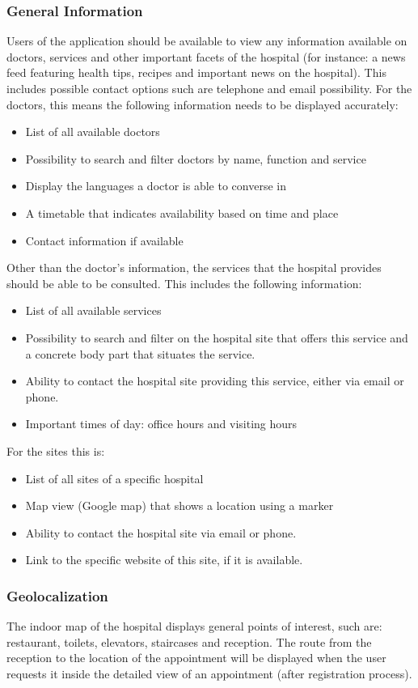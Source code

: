 \subsubsection{General Information}
Users of the application should be available to view any information available on doctors, services and other important facets of the hospital (for instance: a news feed featuring health tips, recipes and important news on the hospital). This includes possible contact options such are telephone and email possibility. For the doctors, this means the following information needs to be displayed accurately:
\begin{itemize}
\item List of all available doctors
\item Possibility to search and filter doctors by name, function and service
\item Display the languages a doctor is able to converse in
\item A timetable that indicates availability based on time and place
\item Contact information if available
\end{itemize}
Other than the doctor's information, the services that the hospital provides should be able to be consulted. This includes the following information:
\begin{itemize}
\item List of all available services
\item Possibility to search and filter on the hospital site that offers this service and a concrete body part that situates the service.
\item Ability to contact the hospital site providing this service, either via email or phone.
\item Important times of day: office hours and visiting hours
\end{itemize}
For the sites this is:
\begin{itemize}
\item List of all sites of a specific hospital
\item Map view (Google map) that shows a location using a marker
\item Ability to contact the hospital site via email or phone.
\item Link to the specific website of this site, if it is available.
\end{itemize}
\subsubsection{Geolocalization}
The indoor map of the hospital displays general points of interest, such are: restaurant, toilets, elevators, staircases and reception. The route from the reception to the location of the appointment will be displayed when the user requests it inside the detailed view of an appointment (after registration process).
